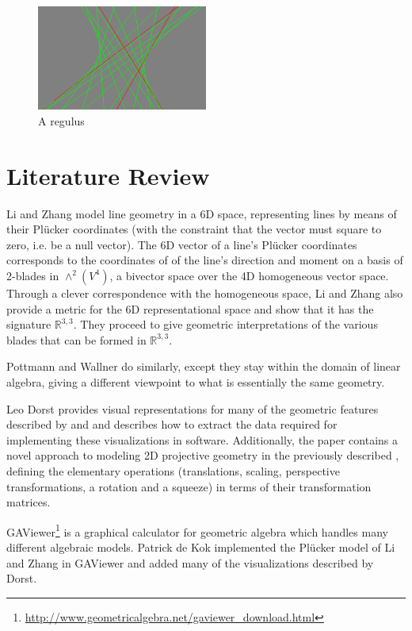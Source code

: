 \documentclass[a4paper, 10pt]{article}
\begin{document}
\begin{figure}[htbp]
  \centering
  \includegraphics[width=0.5\textwidth]{regulus.png}
  \caption{A regulus}
  \label{fig:regulus}
\end{figure}

\section{Literature Review}
Li and Zhang\cite{hangbo2011} model line geometry in a 6D space, representing
lines by means of their Pl\"{u}cker coordinates (with the constraint that the
vector must square to zero, i.e. be a null vector).  The 6D vector of a line's
Pl\"{u}cker coordinates corresponds to the coordinates of of the line's
direction and moment on a basis of 2-blades in $\wedge^2(V^4)$, a bivector space
over the 4D homogeneous vector space. Through a clever correspondence with the
homogeneous space, Li and Zhang also provide a metric for the 6D
representational space and show that it has the signature $\mathbb{R}^{3, 3}$. They
proceed to give geometric interpretations of the various blades that can be
formed in $\mathbb{R}^{3, 3}$.

Pottmann and Wallner\cite{pottmann2001computational} do similarly, except they
stay within the domain of linear algebra, giving a different viewpoint to what is
essentially the same geometry.

Leo Dorst\cite{dorst2013versors} provides visual representations for many of the
geometric features described by \cite{hangbo2011} and
\cite{pottmann2001computational} and describes how to extract the data required
for implementing these visualizations in software. Additionally, the paper
contains a novel approach to modeling 2D projective geometry in the previously
described \rp, defining the elementary operations (translations, scaling,
perspective transformations, a rotation and a squeeze) in terms of their
transformation matrices.

GAViewer\footnote{\url{http://www.geometricalgebra.net/gaviewer\_download.html}}
is a graphical calculator for geometric algebra which handles many different
algebraic models. Patrick de Kok\cite{dekok2012} implemented the
Pl\"{u}cker model of Li and Zhang in GAViewer and added many of the
visualizations described by Dorst.
\end{document}
